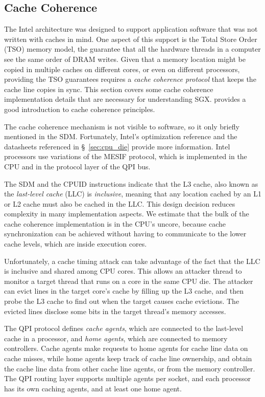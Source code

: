 \subsection{Cache Coherence}
\label{sec:cache_coherence}

The Intel architecture was designed to support application software that was
not written with caches in mind. One aspect of this support is the Total Store
Order (TSO) \cite{owens2009tso} memory model, the guarantee that all the
hardware threads in a computer see the same order of DRAM writes. Given that a
memory location might be copied in multiple caches on different cores, or even
on different processors, providing the TSO guarantees requires a \textit{cache
coherence protocol} that keeps the cache line copies in sync. This section
covers some cache coherence implementation details that are necessary for
understanding SGX. \cite{hennessy2012architecture} provides a good introduction
to cache coherence principles.

The cache coherence mechanism is not visible to software, so it only briefly
mentioned in the SDM. Fortunately, Intel's optimization reference
\cite{intel2014optimization} and the datasheets referenced in
\S~\ref{sec:cpu_die} provide more information. Intel processors use variations
of the MESIF \cite{goodman2009mesif} protocol, which is implemented in the CPU
and in the protocol layer of the QPI bus.

The SDM and the CPUID instructions indicate that the L3 cache, also known as
the \textit{last-level cache} (LLC) is \textit{inclusive}, meaning that any
location cached by an L1 or L2 cache must also be cached in the LLC. This
design decision reduces complexity in many implementation aspects. We estimate
that the bulk of the cache coherence implementation is in the CPU's uncore,
because cache synchronization can be achieved without having to communicate to
the lower cache levels, which are inside execution cores.

Unfortunately, a cache timing attack can take advantage of the fact that the
LLC is inclusive and shared among CPU cores. This allows an attacker thread
to monitor a target thread that runs on a core in the same CPU die. The
attacker can evict lines in the target core's cache by filling up the L3 cache,
and then probe the L3 cache to find out when the target causes cache evictions.
The evicted lines disclose some bits in the target thread's memory accesses.

The QPI protocol defines \textit{cache agents}, which are connected to the
last-level cache in a processor, and \textit{home agents}, which are connected
to memory controllers. Cache agents make requests to home agents for cache line
data on cache misses, while home agents keep track of cache line ownership, and
obtain the cache line data from other cache line agents, or from the memory
controller. The QPI routing layer supports multiple agents per socket, and each
processor has its own caching agents, and at least one home agent.


